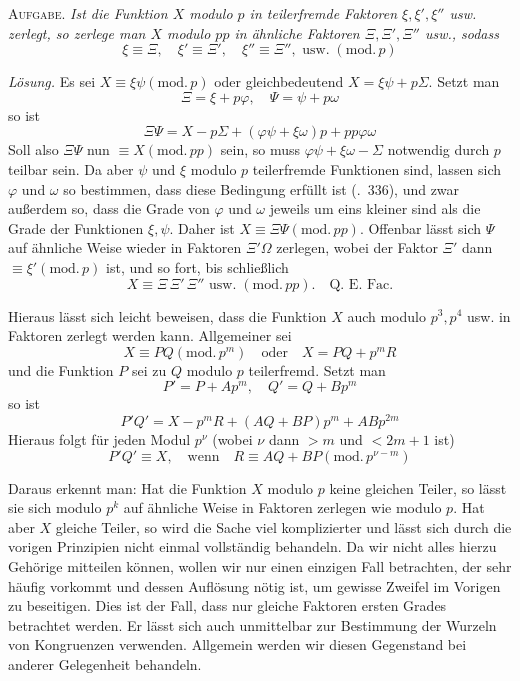 \textsc{Aufgabe.} \emph{Ist die Funktion $X$ modulo $p$ in teilerfremde Faktoren $\xi,\xi',\xi''$ usw. zerlegt, so zerlege man $X$ modulo $pp$ in ähnliche Faktoren $\Xi,\Xi',\Xi''$ usw., sodass}
\[
\xi\equiv\Xi,\quad\xi'\equiv\Xi',\quad\xi''\equiv\Xi'',\text{ usw.}\;(\mathrm{mod.}\,p)
\]

\emph{Lösung.} Es sei $X\equiv\xi\psi(\mathrm{mod.}\,p)$ oder gleichbedeutend $X=\xi\psi+p\Sigma$. Setzt man
\[
\Xi=\xi+p\varphi,\quad\Psi=\psi+p\omega
\]
so ist
\[
\Xi\Psi=X-p\Sigma+(\varphi\psi+\xi\omega)p+pp\varphi\omega
\]
Soll also $\Xi\Psi$ nun $\equiv X(\mathrm{mod.}\,pp)$ sein, so muss $\varphi\psi+\xi\omega-\Sigma$ notwendig durch $p$ teilbar sein. Da aber $\psi$ und $\xi$ modulo $p$ teilerfremde Funktionen sind, lassen sich $\varphi$ und $\omega$ so bestimmen, dass diese Bedingung erfüllt ist (\textsection.\ 336), und zwar außerdem so, dass die Grade von $\varphi$ und $\omega$ jeweils um eins kleiner sind als die Grade der Funktionen $\xi,\psi$. Daher ist $X\equiv\Xi\Psi(\mathrm{mod.}\,pp)$. Offenbar lässt sich $\Psi$ auf ähnliche Weise wieder in Faktoren $\Xi'\Omega$ zerlegen, wobei der Faktor $\Xi'$ dann $\equiv\xi'(\mathrm{mod.}\,p)$ ist, und so fort, bis schließlich
\[
X\equiv\Xi\,\Xi'\,\Xi''\text{ usw.}\;(\mathrm{mod.}\,pp).\quad\text{Q. E. Fac.}
\]

Hieraus lässt sich leicht beweisen, dass die Funktion $X$ auch modulo $p^3,p^4$ usw. in Faktoren zerlegt werden kann. Allgemeiner sei
\[
X\equiv PQ(\mathrm{mod.}\,p^m)\quad\text{oder}\quad X=PQ+p^mR
\]
und die Funktion $P$ sei zu $Q$ modulo $p$ teilerfremd. Setzt man
\[
P'=P+Ap^m,\quad Q'=Q+Bp^m
\]
so ist
\[
P'Q'=X-p^mR+(AQ+BP)p^m+ABp^{2m}
\]
Hieraus folgt für jeden Modul $p^\nu$ (wobei $\nu$ dann $>m$ und $<2m+1$ ist)
\[
P'Q'\equiv X,\quad\text{wenn}\quad R\equiv AQ+BP(\mathrm{mod.}\,p^{\nu-m})
\]

Daraus erkennt man: Hat die Funktion $X$ modulo $p$ keine gleichen Teiler, so lässt sie sich modulo $p^k$ auf ähnliche Weise in Faktoren zerlegen wie modulo $p$. Hat aber $X$ gleiche Teiler, so wird die Sache viel komplizierter und lässt sich durch die vorigen Prinzipien nicht einmal vollständig behandeln. Da wir nicht alles hierzu Gehörige mitteilen können, wollen wir nur einen einzigen Fall betrachten, der sehr häufig vorkommt und dessen Auflösung nötig ist, um gewisse Zweifel im Vorigen zu beseitigen. Dies ist der Fall, dass nur gleiche Faktoren ersten Grades betrachtet werden. Er lässt sich auch unmittelbar zur Bestimmung der Wurzeln von Kongruenzen verwenden. Allgemein werden wir diesen Gegenstand bei anderer Gelegenheit behandeln.

